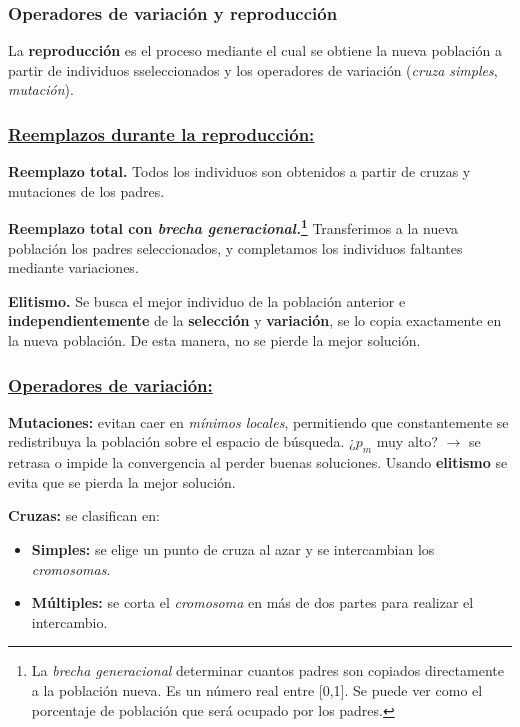 \documentclass[10pt,a4paper]{article}
\begin{document}
\subsubsection{Operadores de variación y reproducción}

La \textbf{reproducción} es el proceso mediante el cual se obtiene la nueva población a partir de individuos sseleccionados y los operadores de variación (\textit{cruza simples}, \textit{mutación}).

\subsubsection*{\underline{Reemplazos durante la reproducción:}}

\begin{description}
\item \textbf{Reemplazo total.} Todos los individuos son obtenidos a partir de cruzas y mutaciones de los padres.
\item \textbf{Reemplazo total con \textit{brecha generacional.}\footnote{La \textit{brecha generacional} determinar cuantos padres son copiados directamente a la población nueva. Es un número real entre [0,1]. Se puede ver como el porcentaje de población que será ocupado por los padres.}} Transferimos a la nueva población los padres seleccionados, y completamos los individuos faltantes mediante variaciones.
\item \textbf{Elitismo.} Se busca el mejor individuo de la población anterior e \textbf{independientemente} de la \textbf{selección} y \textbf{variación}, se lo copia exactamente en la nueva población. De esta manera, no se pierde la mejor solución.
\end{description}

\subsubsection*{\underline{Operadores de variación:}}

\begin{description}
\item \textbf{Mutaciones:} evitan caer en \textit{mínimos locales}, permitiendo que constantemente se redistribuya la población sobre el espacio de búsqueda. ¿$p_m$ muy alto? $\rightarrow$ se retrasa o impide la convergencia al perder buenas soluciones. Usando \textbf{elitismo} se  evita que se pierda la mejor solución.
\item \textbf{Cruzas:} se clasifican en:
\begin{itemize}
\item \textbf{Simples:} se elige un punto de cruza al azar y se intercambian los \textit{cromosomas}.
\item \textbf{Múltiples:} se corta el \textit{cromosoma} en más de dos partes para realizar el intercambio.
\end{itemize}
\end{description}
\end{document}
